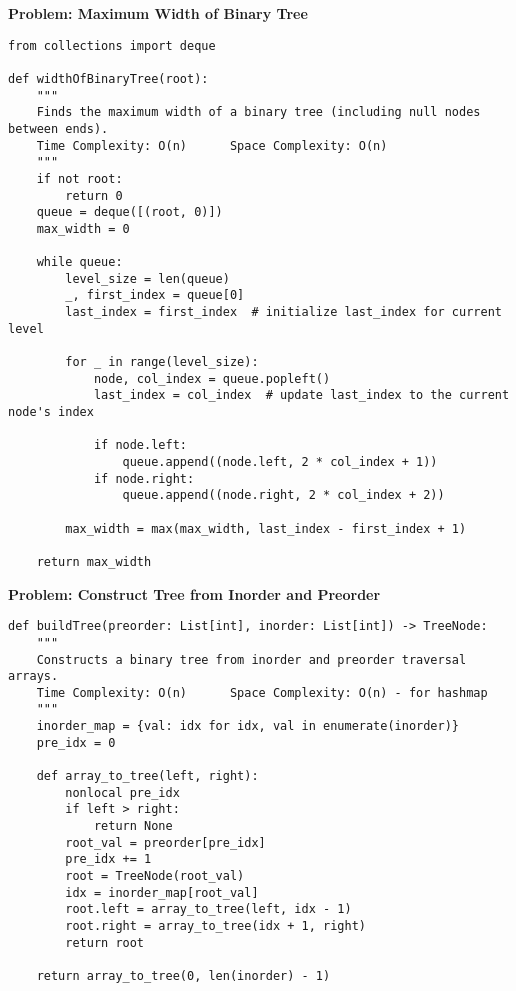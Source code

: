 \noindent\textbf{Problem: Maximum Width of Binary Tree}
\begin{verbatim}
from collections import deque

def widthOfBinaryTree(root):
    """
    Finds the maximum width of a binary tree (including null nodes between ends).
    Time Complexity: O(n)      Space Complexity: O(n)
    """
    if not root:
        return 0
    queue = deque([(root, 0)])
    max_width = 0

    while queue:
        level_size = len(queue)
        _, first_index = queue[0]
        last_index = first_index  # initialize last_index for current level

        for _ in range(level_size):
            node, col_index = queue.popleft()
            last_index = col_index  # update last_index to the current node's index

            if node.left:
                queue.append((node.left, 2 * col_index + 1))
            if node.right:
                queue.append((node.right, 2 * col_index + 2))

        max_width = max(max_width, last_index - first_index + 1)

    return max_width
\end{verbatim}

\noindent\textbf{Problem: Construct Tree from Inorder and Preorder}
\begin{verbatim}
def buildTree(preorder: List[int], inorder: List[int]) -> TreeNode:
    """
    Constructs a binary tree from inorder and preorder traversal arrays.
    Time Complexity: O(n)      Space Complexity: O(n) - for hashmap
    """
    inorder_map = {val: idx for idx, val in enumerate(inorder)}
    pre_idx = 0
    
    def array_to_tree(left, right):
        nonlocal pre_idx
        if left > right:
            return None
        root_val = preorder[pre_idx]
        pre_idx += 1
        root = TreeNode(root_val)
        idx = inorder_map[root_val]
        root.left = array_to_tree(left, idx - 1)
        root.right = array_to_tree(idx + 1, right)
        return root
    
    return array_to_tree(0, len(inorder) - 1)
\end{verbatim}

